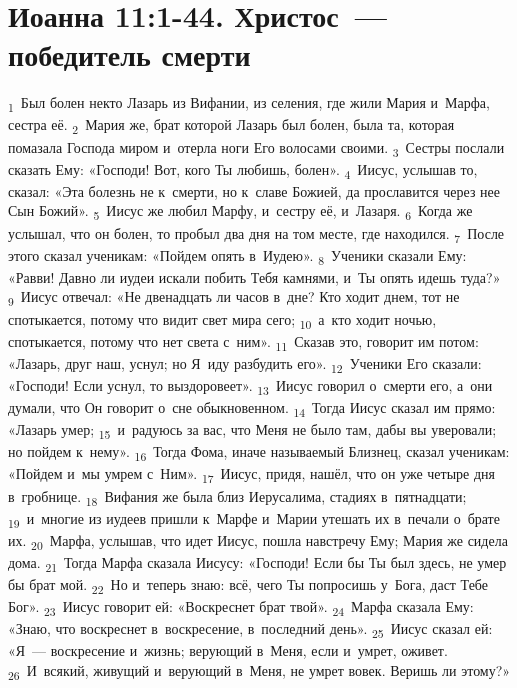 \documentclass[a4paper,12pt]{article}
\begin{document}
\section{Иоанна 11:1-44. Христос~--- победитель смерти}


\textsubscript{1}~Был болен некто Лазарь из Вифании, из селения, где жили Мария и~Марфа, сестра её.
\textsubscript{2}~Мария же, брат которой Лазарь был болен, была та, которая помазала Господа миром и~отерла ноги Его волосами своими.
\textsubscript{3}~Сестры послали сказать Ему: «Господи! Вот, кого Ты любишь, болен».
\textsubscript{4}~Иисус, услышав то, сказал: «Эта болезнь не к~смерти, но к~славе Божией, да прославится через нее Сын Божий».
\textsubscript{5}~Иисус же любил Марфу, и~сестру её, и~Лазаря.
\textsubscript{6}~Когда же услышал, что он болен, то пробыл два дня на том месте, где находился.
\textsubscript{7}~После этого сказал ученикам: «Пойдем опять в~Иудею».
\textsubscript{8}~Ученики сказали Ему: «Равви! Давно ли иудеи искали побить Тебя камнями, и~Ты опять идешь туда?»
\textsubscript{9}~Иисус отвечал: «Не двенадцать ли часов в~дне? Кто ходит днем, тот не спотыкается, потому что видит свет мира сего;
\textsubscript{10}~а~кто ходит ночью, спотыкается, потому что нет света с~ним».
\textsubscript{11}~Сказав это, говорит им потом: «Лазарь, друг наш, уснул; но Я~иду разбудить его».
\textsubscript{12}~Ученики Его сказали: «Господи! Если уснул, то выздоровеет».
\textsubscript{13}~Иисус говорил о~смерти его, а~они думали, что Он говорит о~сне обыкновенном.
\textsubscript{14}~Тогда Иисус сказал им прямо: «Лазарь умер;
\textsubscript{15}~и~радуюсь за вас, что Меня не было там, дабы вы уверовали; но пойдем к~нему».
\textsubscript{16}~Тогда Фома, иначе называемый Близнец, сказал ученикам: «Пойдем и~мы умрем с~Ним».
\textsubscript{17}~Иисус, придя, нашёл, что он уже четыре дня в~гробнице.
\textsubscript{18}~Вифания же была близ Иерусалима, стадиях в~пятнадцати;
\textsubscript{19}~и~многие из иудеев пришли к~Марфе и~Марии утешать их в~печали о~брате их.
\textsubscript{20}~Марфа, услышав, что идет Иисус, пошла навстречу Ему; Мария же сидела дома.
\textsubscript{21}~Тогда Марфа сказала Иисусу: «Господи! Если бы Ты был здесь, не умер бы брат мой.
\textsubscript{22}~Но и~теперь знаю: всё, чего Ты попросишь у~Бога, даст Тебе Бог».
\textsubscript{23}~Иисус говорит ей: «Воскреснет брат твой».
\textsubscript{24}~Марфа сказала Ему: «Знаю, что воскреснет в~воскресение, в~последний день».
\textsubscript{25}~Иисус сказал ей: «Я~--- воскресение и~жизнь; верующий в~Меня, если и~умрет, оживет.
\textsubscript{26}~И~всякий, живущий и~верующий в~Меня, не умрет вовек. Веришь ли этому?»
\end{document}
